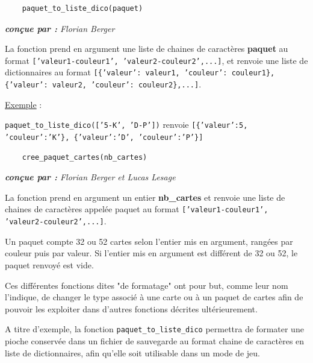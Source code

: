 \documentclass[titlepage]{article}
\begin{document}
\noindent	\begin{minipage}{\textwidth}
	\begin{lstlisting}
	paquet_to_liste_dico(paquet)
	\end{lstlisting}
	\end{minipage}
	
\emph{\textbf{conçue par : } Florian Berger} \vspace{2mm}\par
La fonction prend en argument une liste de chaines de caractères \textbf{paquet} au format \texttt{['valeur1-couleur1', 'valeur2-couleur2',...]}, et renvoie une liste de dictionnaires au format \texttt{[\{'valeur': valeur1, 'couleur': couleur1\}, \{'valeur': valeur2, 'couleur': couleur2\},...]}.\vspace{1mm}\par
\underline{Exemple} :\par
\texttt{paquet\_to\_liste\_dico(['5-K', 'D-P'])} renvoie \texttt{[\{'valeur':5, 'couleur':'K'\}, \{'valeur':'D', 'couleur':'P'\}]}\par
\vspace{5mm}
	
\noindent	\begin{minipage}{\textwidth}
	\begin{lstlisting}
	cree_paquet_cartes(nb_cartes)
	\end{lstlisting}	
	\end{minipage}

\emph{\textbf{conçue par : } Florian Berger et Lucas Lesage} \vspace{2mm}\par
La fonction prend en argument un entier \textbf{nb\_cartes} et renvoie une liste de chaines de caractères appelée paquet au format \texttt{['valeur1-couleur1', 'valeur2-couleur2',...]}. \par
Un paquet compte 32 ou 52 cartes selon l'entier mis en argument, rangées par couleur puis par valeur. Si l'entier mis en argument est différent de 32 ou 52, le paquet renvoyé est vide.\par

\bigskip

Ces différentes fonctions dites "de formatage" ont pour but, comme leur nom l'indique, de changer le type associé à une carte ou à un paquet de cartes afin de pouvoir les exploiter dans d'autres fonctions décrites ultérieurement.\par
A titre d'exemple, la fonction \texttt{paquet\_to\_liste\_dico} permettra de formater une pioche conservée dans un fichier de sauvegarde au format chaine de caractères en liste de dictionnaires, afin qu'elle soit utilisable dans un mode de jeu.
\end{document}
